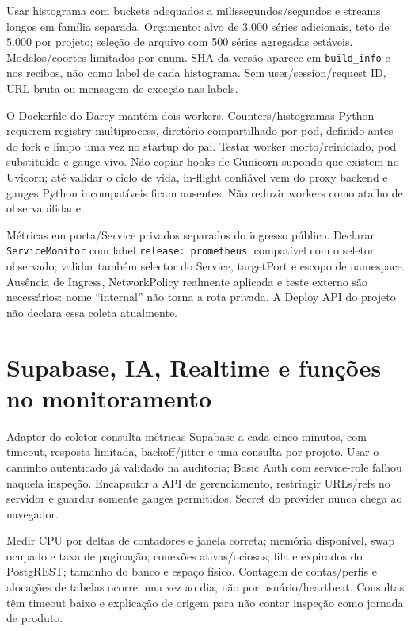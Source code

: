 \documentclass[10pt,a4paper]{article}
\begin{document}
Usar histograma com buckets adequados a milissegundos/segundos e streams
longos em família separada. Orçamento: alvo de 3.000 séries adicionais,
teto de 5.000 por projeto; seleção de arquivo com 500 séries agregadas
estáveis. Modelos/coortes limitados por enum. SHA da versão aparece em
{\footnotesize\ttfamily\nolinkurl{build_info}} e nos recibos, não como label de cada histograma.
Sem user/session/request ID, URL bruta ou mensagem de exceção nas
labels.

O Dockerfile do Darcy mantém dois workers. Counters/histogramas Python
requerem registry multiprocess, diretório compartilhado por pod,
definido antes do fork e limpo uma vez no startup do pai. Testar worker
morto/reiniciado, pod substituído e gauge vivo. Não copiar hooks de
Gunicorn supondo que existem no Uvicorn; até validar o ciclo de vida,
in-flight confiável vem do proxy backend e gauges Python incompatíveis
ficam ausentes. Não reduzir workers como atalho de observabilidade.

Métricas em porta/Service privados separados do ingresso público.
Declarar {\footnotesize\ttfamily\nolinkurl{ServiceMonitor}} com label
{\footnotesize\ttfamily\nolinkurl{release:}\ \nolinkurl{prometheus}}, compatível com o seletor observado;
validar também selector do Service, targetPort e escopo de namespace.
Ausência de Ingress, NetworkPolicy realmente aplicada e teste externo
são necessários: nome ``internal'' não torna a rota privada. A Deploy
API do projeto não declara essa coleta atualmente.

\clearpage
\section{Supabase, IA, Realtime e funções no
monitoramento}\label{supabase-ia-realtime-e-funuxe7uxf5es-no-monitoramento}

Adapter do coletor consulta métricas Supabase a cada cinco minutos, com
timeout, resposta limitada, backoff/jitter e uma consulta por projeto.
Usar o caminho autenticado já validado na auditoria; Basic Auth com
service-role falhou naquela inspeção. Encapsular a API de gerenciamento,
restringir URLs/refs no servidor e guardar somente gauges permitidos.
Secret do provider nunca chega ao navegador.

Medir CPU por deltas de contadores e janela correta; memória disponível,
swap ocupado e taxa de paginação; conexões ativas/ociosas; fila e
expirados do PostgREST; tamanho do banco e espaço físico. Contagem de
contas/perfis e alocações de tabelas ocorre uma vez ao dia, não por
usuário/heartbeat. Consultas têm timeout baixo e explicação de origem
para não contar inspeção como jornada de produto.
\end{document}
